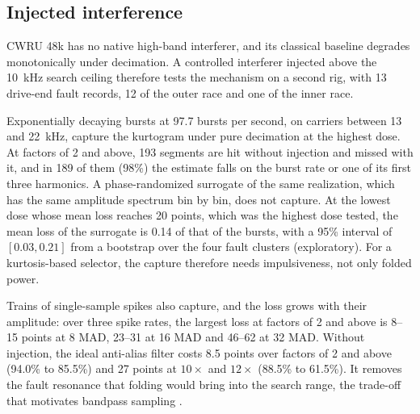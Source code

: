 \subsection{Injected interference}
\label{sec:res-injected}

CWRU 48k has no native high-band interferer, and its classical baseline degrades monotonically
under decimation. A controlled interferer injected above the 10~kHz search ceiling therefore tests
the mechanism on a second rig, with 13 drive-end fault records, 12 of the outer race and one of the
inner race.

Exponentially decaying bursts at 97.7 bursts per second, on carriers between 13 and 22~kHz, capture
the kurtogram under pure decimation at the highest dose. At factors of 2 and above, 193 segments are
hit without injection and missed with it, and in 189 of them (98\%) the estimate falls on the burst
rate or one of its first three harmonics. A phase-randomized surrogate of the same realization, which
has the same amplitude spectrum bin by bin, does not capture. At the lowest dose whose mean loss
reaches 20 points, which was the highest dose tested, the mean loss of the surrogate is 0.14 of that
of the bursts, with a 95\% interval of $[0.03, 0.21]$ from a bootstrap over the four fault clusters
(exploratory). For a kurtosis-based selector, the capture therefore needs impulsiveness, not only
folded power.

Trains of single-sample spikes also capture, and the loss grows with their amplitude: over three
spike rates, the largest loss at factors of 2 and above is 8--15 points at 8 MAD, 23--31 at 16 MAD
and 46--62 at 32 MAD. Without injection, the ideal anti-alias filter costs 8.5 points over factors
of 2 and above (94.0\% to 85.5\%) and 27 points at $10\times$ and $12\times$ (88.5\% to 61.5\%). It
removes the fault resonance that folding would bring into the search range, the trade-off that
motivates bandpass sampling \citep{vaughan1991}.

